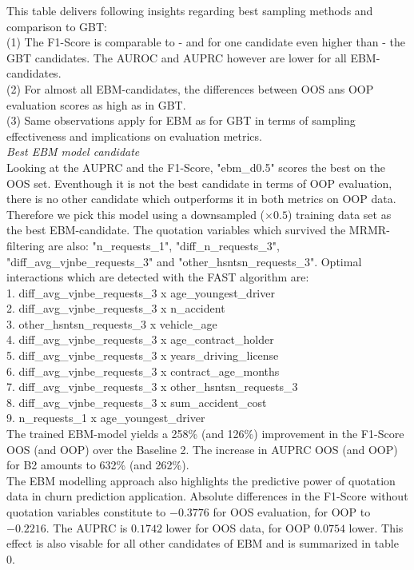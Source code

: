 \documentclass[12pt,titlepage]{article}
\begin{document}
This table delivers following insights regarding best sampling methods and comparison to GBT: \\
(1) The F1-Score is comparable to - and for one candidate even higher than - the GBT candidates. The AUROC and AUPRC however are lower for all EBM-candidates. \\
(2) For almost all EBM-candidates, the differences between OOS ans OOP evaluation scores as high as in GBT. \\
(3) Same observations apply for EBM as for GBT in terms of sampling effectiveness and implications on evaluation metrics. \\

\textit{Best EBM model candidate} \\
Looking at the AUPRC and the F1-Score, "ebm\_d0.5" scores the best on the OOS set. Eventhough it is not the best candidate in terms of OOP evaluation, there is no other candidate which outperforms it in both metrics on OOP data. Therefore we pick this model using a downsampled ($\times 0.5$) training data set as the best EBM-candidate. The quotation variables which survived the MRMR-filtering are also: "n\_requests\_1", "diff\_n\_requests\_3", "diff\_avg\_vjnbe\_requests\_3" and "other\_hsntsn\_requests\_3". Optimal interactions which are detected with the FAST algorithm are: \\
1. diff\_avg\_vjnbe\_requests\_3 x age\_youngest\_driver \\
2. diff\_avg\_vjnbe\_requests\_3 x n\_accident \\
3. other\_hsntsn\_requests\_3 x vehicle\_age \\
4. diff\_avg\_vjnbe\_requests\_3 x age\_contract\_holder \\
5. diff\_avg\_vjnbe\_requests\_3 x years\_driving\_license \\
6. diff\_avg\_vjnbe\_requests\_3 x contract\_age\_months \\
7. diff\_avg\_vjnbe\_requests\_3 x other\_hsntsn\_requests\_3 \\
8. diff\_avg\_vjnbe\_requests\_3 x sum\_accident\_cost \\
9. n\_requests\_1 x age\_youngest\_driver \\
The trained EBM-model yields a 258\% (and 126\%) improvement in the F1-Score OOS (and OOP) over the Baseline 2. The increase in AUPRC OOS (and OOP) for B2 amounts to 632\% (and 262\%). \\
The EBM modelling approach also highlights the predictive power of quotation data in churn prediction application. Absolute differences in the F1-Score without quotation variables constitute to $-0.3776$ for OOS evaluation, for OOP to $-0.2216$. The AUPRC is $0.1742$ lower for OOS data, for OOP $0.0754$ lower. This effect is also visable for all other candidates of EBM and is summarized in table 0. \\
\end{document}
